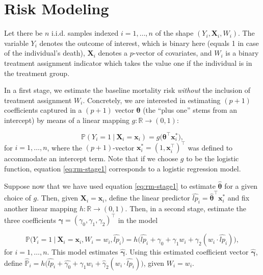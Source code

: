 \documentclass[12pt]{article}
\begin{document}
\section{Risk Modeling}
Let there be $n$ i.i.d. samples indexed $i=1,\dots,n$ of the shape $(Y_i, \mathbf{X}_i, W_i)$. The variable $Y_i$ denotes the outcome of interest, which is binary here (equals 1 in case of the individual's death), $\mathbf{X}_i$ denotes a $p$-vector of covariates, and $W_i$ is a binary treatment assignment indicator which takes the value one if the individual is in the treatment group.

In a first stage, we estimate the baseline mortality risk \textit{without} the inclusion of treatment assignment $W_i$. Concretely, we are interested in estimating $(p+1)$ coefficients captured in a $(p+1)$ vector $\bm{\theta}$ (the ``plus one'' stems from an intercept) by means of a linear mapping $g: \mathbb{R} \to (0,1)$:

\begin{equation} \label{eq:rm-stage1}
	\mathbb{P}(Y_i=1\ |\ \mathbf{X}_i = \mathbf{x}_i)
	=
	g \Big( \bm{\theta}^\top \mathbf{x}_i^* \Big),	
\end{equation}
for $i=1,\dots,n$, where the $(p+1)$-vector $\mathbf{x}_i^* = (1, \mathbf{x}_i^\top)^\top$ was defined to accommodate an intercept term. Note that if we choose $g$ to be the logistic function, equation \eqref{eq:rm-stage1} corresponds to a logistic regression model.

Suppose now that we have used equation \eqref{eq:rm-stage1} to estimate $\bm{\hat{\theta}}$ for a given choice of $g$. Then, given $\mathbf{X}_i = \mathbf{x}_i$, define the linear predictor $\widehat{lp}_i = \bm{\hat{\theta}}^\top \mathbf{x}_i^*$ and fix another linear mapping $h: \mathbb{R} \to (0,1)$. Then, in a second stage, estimate the three coefficients $\bm{\gamma} = (\gamma_0, \gamma_1, \gamma_2)^\top$ in the model

\begin{equation}
	\mathbb{P} \Big( Y_i = 1\ |\ \mathbf{X}_i = \mathbf{x}_i, W_i = w_i, \widehat{lp}_i \Big) 
	=
	h\Big( 
	\widehat{lp}_i + \gamma_0 + \gamma_1 w_i + \gamma_2 (w_i \cdot \widehat{lp}_i)
	\Big),
\end{equation}
for $i=1,\dots,n$. This model estimates $\bm{\hat{\gamma}}$. Using this estimated coefficient vector $\bm{\hat{\gamma}}$, define $\widehat{\mathbb{P}}_i = h\Big( 
	\widehat{lp}_i + \hat{\gamma_0} + \hat{\gamma}_1 w_i + \hat{\gamma}_2 (w_i \cdot \widehat{lp}_i)
	\Big)$, given $W_i = w_i$.
\end{document}
